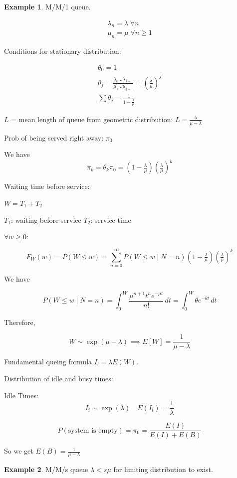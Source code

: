 \documentclass{article}
\theoremstyle{definition}
\newtheorem{exmp}{Example}[section]
\begin{document}
\begin{exmp}
M/M/1 queue. 

\begin{align*}
\lambda_n = \lambda \; \forall n \\ 
\mu_n = \mu \; \forall n \ge 1
\end{align*}

Conditions for stationary distribution:

\begin{align*}
\theta_0 = 1 \\
\theta_j = \frac{\lambda_0 \ldots \lambda_{j-1}}{\mu_1 \ldots \mu_{j-1}} = \left( \frac{\lambda}{\mu} \right)^j \\
\sum \theta_j = \frac{1}{1 - \tfrac{\lambda}{\mu} }
\end{align*}

$L$ = mean length of queue 
from geometric distribution: $L = \frac{\lambda}{\mu-\lambda}$

Prob of being served right away: $\pi_0$

We have
$$
\pi_k = \theta_k \pi_0 = \left( 1 - \tfrac{\lambda}{\mu} \right) \left( \tfrac{\lambda}{\mu}\right)^k
$$

Waiting time before service: 

$W = T_1 + T_2$

$T_1$: waiting before service
$T_2$: service time

$\forall w \ge 0:$

$$
F_W(w) = P(W \le w) = \sum_{n=0}^\infty P(W \le w \mid N = n) \left( 1 - \tfrac{\lambda}{\mu} \right) \left( \tfrac{\lambda}{\mu}\right)^k 
$$

We have 

$$
P(W \le w \mid N = n) = \int_0^W \frac{\mu^{n+1} t^n e^{-\mu t}}{n!} \, dt = \int_0^W \theta e^{-\theta t} \, dt 
$$

Therefore,

$$
W \sim \exp(\mu - \lambda) \implies E[W] = \frac{1}{\mu - \lambda}
$$

Fundamental queing formula $L = \lambda E(W)$.

Distribution of idle and busy times:

Idle Times:
$$
I_i \sim \exp(\lambda) \quad E(I_i) = \frac{1}{\lambda}
$$

$$
P(\text{system is empty}) = \pi_0 = \frac{E(I)}{E(I) + E(B)} 
$$

So we get $E(B) = \frac{1}{\mu - \lambda}$
\end{exmp}

\begin{exmp}{M/M/s queue}
$ \lambda < s \mu$ for limiting distribution to exist.
\end{exmp}
\end{document}
